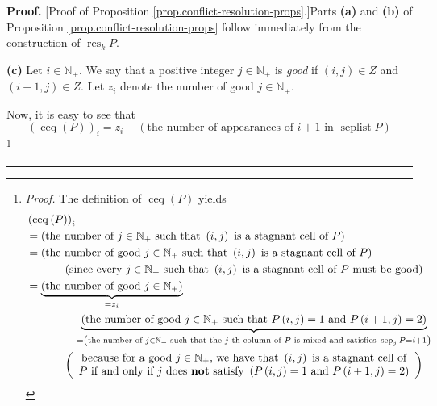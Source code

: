 \documentclass[numbers=enddot,12pt,final,onecolumn,notitlepage]{scrartcl}%
\theoremstyle{definition}
\newenvironment{proof}[1][Proof]{\noindent\textbf{#1.} }{\ \rule{0.5em}{0.5em}}
\begin{document}
\begin{proof}
[Proof of Proposition \ref{prop.conflict-resolution-props}.]Parts \textbf{(a)}
and \textbf{(b)} of Proposition \ref{prop.conflict-resolution-props} follow
immediately from the construction of $\operatorname*{res}\nolimits_{k}P$.

\textbf{(c)} Let $i\in\mathbb{N}_{+}$. We say that a positive integer
$j\in\mathbb{N}_{+}$ is \textit{good} if $\left(  i,j\right)  \in Z$ and
$\left(  i+1,j\right)  \in Z$. Let $z_{i}$ denote the number of good
$j\in\mathbb{N}_{+}$.

Now, it is easy to see that%
\[
\left(  \operatorname*{ceq}\left(  P\right)  \right)  _{i}=z_{i}-\left(
\text{the number of appearances of }i+1\text{ in }\operatorname*{seplist}%
P\right)
\]
\footnote{\textit{Proof.} The definition of $\operatorname*{ceq}\left(
P\right)  $ yields%
\begin{align*}
&  \left(  \operatorname*{ceq}\left(  P\right)  \right)  _{i}\\
&  =\left(  \text{the number of }j\in\mathbb{N}_{+}\text{ such that }\left(
i,j\right)  \text{ is a stagnant cell of }P\right) \\
&  =\left(  \text{the number of good }j\in\mathbb{N}_{+}\text{ such that
}\left(  i,j\right)  \text{ is a stagnant cell of }P\right) \\
&  \ \ \ \ \ \ \ \ \ \ \left(  \text{since every }j\in\mathbb{N}_{+}\text{
such that }\left(  i,j\right)  \text{ is a stagnant cell of }P\text{ must be
good}\right) \\
&  =\underbrace{\left(  \text{the number of good }j\in\mathbb{N}_{+}\right)
}_{=z_{i}}\\
&  \ \ \ \ \ \ \ \ \ \ -\underbrace{\left(  \text{the number of good }%
j\in\mathbb{N}_{+}\text{ such that }P\left(  i,j\right)  =1\text{ and
}P\left(  i+1,j\right)  =2\right)  }_{=\left(  \text{the number of }%
j\in\mathbb{N}_{+}\text{ such that the }j\text{-th column of }P\text{ is mixed
and satisfies }\operatorname*{sep}\nolimits_{j}P=i+1\right)  }\\
&  \ \ \ \ \ \ \ \ \ \ \left(
\begin{array}
[c]{c}%
\text{because for a good }j\in\mathbb{N}_{+}\text{, we have that }\left(
i,j\right)  \text{ is a stagnant cell of}\\
P\text{ if and only if }j\text{ does \textbf{not} satisfy }\left(  P\left(
i,j\right)  =1\text{ and }P\left(  i+1,j\right)  =2\right)
\end{array}
\right) \\

\end{align*}}
\end{proof}
\end{document}
